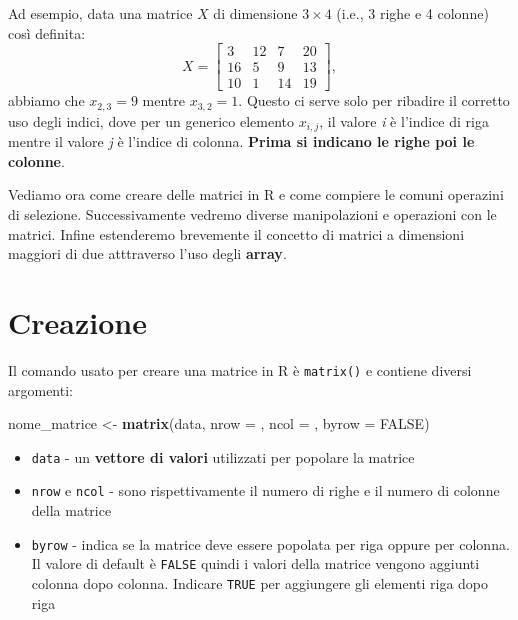 \documentclass[
]{book}
\newenvironment{Shaded}{\begin{snugshade}}{\end{snugshade}}
\newcommand{\DataTypeTok}[1]{\textcolor[rgb]{0.13,0.29,0.53}{#1}}
\newcommand{\KeywordTok}[1]{\textcolor[rgb]{0.13,0.29,0.53}{\textbf{#1}}}
\newcommand{\NormalTok}[1]{#1}
\newcommand{\OtherTok}[1]{\textcolor[rgb]{0.56,0.35,0.01}{#1}}
\newcommand{\StringTok}[1]{\textcolor[rgb]{0.31,0.60,0.02}{#1}}
\providecommand{\tightlist}{%
  \setlength{\itemsep}{0pt}\setlength{\parskip}{0pt}}
\begin{document}
Ad esempio, data una matrice \(X\) di dimensione \(3\times4\) (i.e., 3 righe e 4 colonne) così definita:
\[
 X = 
\begin{bmatrix}
3 & 12 & 7 & 20\\
16 & 5 & 9 & 13\\
10 & 1 & 14 & 19
\end{bmatrix},
\]
abbiamo che \(x_{2, 3} = 9\) mentre \(x_{3, 2} = 1\). Questo ci serve solo per ribadire il corretto uso degli indici, dove per un generico elemento \(x_{i, j}\), il valore \emph{i} è l'indice di riga mentre il valore \emph{j} è l'indice di colonna. \textbf{Prima si indicano le righe poi le colonne}.

Vediamo ora come creare delle matrici in R e come compiere le comuni operazini di selezione. Successivamente vedremo diverse manipolazioni e operazioni con le matrici. Infine estenderemo brevemente il concetto di matrici a dimensioni maggiori di due atttraverso l'uso degli \textbf{array}.

\hypertarget{creazione-1}{%
\section{Creazione}\label{creazione-1}}

Il comando usato per creare una matrice in R è \texttt{matrix()} e contiene diversi argomenti:

\begin{Shaded}
\begin{Highlighting}[]
\NormalTok{nome_matrice <-}\StringTok{ }\KeywordTok{matrix}\NormalTok{(data, }\DataTypeTok{nrow =}\NormalTok{ , }\DataTypeTok{ncol =}\NormalTok{ , }\DataTypeTok{byrow =} \OtherTok{FALSE}\NormalTok{)}
\end{Highlighting}
\end{Shaded}

\begin{itemize}
\tightlist
\item
  \texttt{data} - un \textbf{vettore di valori} utilizzati per popolare la matrice
\item
  \texttt{nrow} e \texttt{ncol} - sono rispettivamente il numero di righe e il numero di colonne della matrice
\item
  \texttt{byrow} - indica se la matrice deve essere popolata per riga oppure per colonna. Il valore di default è \texttt{FALSE} quindi i valori della matrice vengono aggiunti colonna dopo colonna. Indicare \texttt{TRUE} per aggiungere gli elementi riga dopo riga
\end{itemize}
\end{document}
